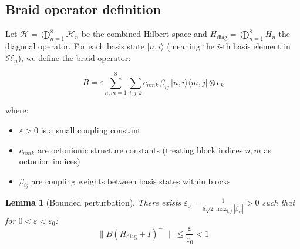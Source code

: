 \documentclass[11pt,a4paper]{article}
\newtheorem{lemma}[theorem]{Lemma}
\theoremstyle{definition}
\theoremstyle{remark}
\begin{document}
\subsection{Braid operator definition}

Let $\mathcal{H} = \bigoplus_{n=1}^8 \mathcal{H}_n$ be the combined Hilbert space 
and $H_{\text{diag}} = \bigoplus_{n=1}^8 H_n$ the diagonal operator. 
For each basis state $|n,i\rangle$ (meaning the $i$-th basis element in $\mathcal{H}_n$), 
we define the braid operator:

\begin{equation}\label{eq:braid-def}
B = \varepsilon \sum_{n,m=1}^8 \sum_{i,j,k} c_{nmk} \, \beta_{ij} \, 
|n,i\rangle\langle m,j| \otimes e_k
\end{equation}

where:
\begin{itemize}
\item $\varepsilon > 0$ is a small coupling constant
\item $c_{nmk}$ are octonionic structure constants (treating block indices $n,m$ as octonion indices)
\item $\beta_{ij}$ are coupling weights between basis states within blocks
\end{itemize}

\begin{lemma}[Bounded perturbation]\label{lem:braid-bounded}
There exists $\varepsilon_0 = \frac{1}{8\sqrt{2}\max_{i,j}|\beta_{ij}|} > 0$ such that for $0 < \varepsilon < \varepsilon_0$:
\[
\|B(H_{\text{diag}} + I)^{-1}\| \leq \frac{\varepsilon}{\varepsilon_0} < 1
\]
\end{lemma}
\end{document}
